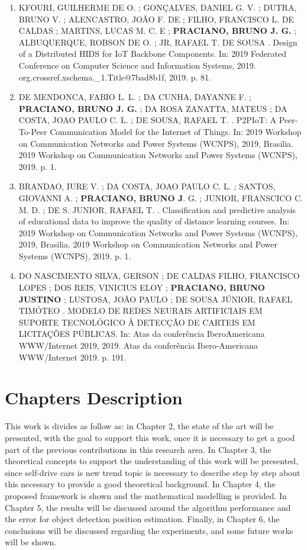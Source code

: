 \begin{enumerate}
\item KFOURI, GUILHERME DE O. ; GONÇALVES, DANIEL G. V. ; DUTRA, BRUNO V. ; ALENCASTRO, JOÃO F. DE ; FILHO, FRANCISCO L. DE CALDAS ; MARTINS, LUCAS M. C. E ; \textbf{PRACIANO, BRUNO J. G.} ; ALBUQUERQUE, ROBSON DE O. ; JR, RAFAEL T. DE SOUSA . Design of a Distributed HIDS for IoT Backbone Components. In: 2019 Federated Conference on Computer Science and Information Systems, 2019. org.crossref.xschema.\_1.Title@7bad8b1f, 2019. p. 81.

\item DE MENDONCA, FABIO L. L. ; DA CUNHA, DAYANNE F. ; \textbf{PRACIANO, BRUNO J. G.} ; DA ROSA ZANATTA, MATEUS ; DA COSTA, JOAO PAULO C. L. ; DE SOUSA, RAFAEL T. . P2PIoT: A Peer-To-Peer Communication Model for the Internet of Things. In: 2019 Workshop on Communication Networks and Power Systems (WCNPS), 2019, Brasilia. 2019 Workshop on Communication Networks and Power Systems (WCNPS), 2019. p. 1.

\item BRANDAO, IURE V. ; DA COSTA, JOAO PAULO C. L. ; SANTOS, GIOVANNI A. ; \textbf{PRACIANO, BRUNO J}. G. ; JUNIOR, FRANSCICO C. M. D. ; DE S. JUNIOR, RAFAEL T. . Classification and predictive analysis of educational data to improve the quality of distance learning courses. In: 2019 Workshop on Communication Networks and Power Systems (WCNPS), 2019, Brasilia. 2019 Workshop on Communication Networks and Power Systems (WCNPS), 2019. p. 1.


\item DO NASCIMENTO SILVA, GERSON ; DE CALDAS FILHO, FRANCISCO LOPES ; DOS REIS, VINICIUS ELOY ; \textbf{PRACIANO, BRUNO JUSTINO }; LUSTOSA, JOÃO PAULO ; DE SOUSA JÚNIOR, RAFAEL TIMÓTEO . MODELO DE REDES NEURAIS ARTIFICIAIS EM SUPORTE TECNOLÓGICO À DETECÇÃO DE CARTEIS EM LICITAÇÕES PÚBLICAS. In: Atas da conferência IberoAmericana WWW/Internet 2019, 2019. Atas da conferência Ibero-Americana WWW/Internet 2019. p. 191.

\end{enumerate}

\section{Chapters Description}

This work is divides as follow as: in Chapter 2, the state of the art will be presented, with the goal to support this work, once it is necessary to get a good part of the previous contributions in this research area. In Chapter 3, the theoretical concepts to support the understanding of this work will be presented, since self-drive cars is new trend topic is necessary to describe step by step about this necessary to provide a good theoretical background. In Chapter 4, the proposed framework is shown and the mathematical modelling is provided. In Chapter 5, the results will be discussed around the algorithm performance and the error for object detection position estimation. Finally, in Chapter 6, the conclusions will be discussed regarding the experiments, and some future works will be shown.


